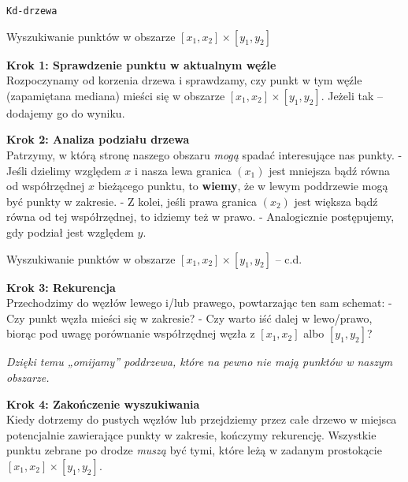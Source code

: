 \documentclass[aspectratio=1610, polish]{beamer}
\begin{document}
\begin{section}{\texttt{Kd-drzewa}}
\begin{frame}{Wyszukiwanie punktów w obszarze \([x_1, x_2] \times [y_1, y_2]\)}

\begin{mdframed}
\textbf{Krok 1: Sprawdzenie punktu w aktualnym węźle}\\[3pt]
Rozpoczynamy od korzenia drzewa i sprawdzamy, czy punkt w tym węźle
(zapamiętana mediana) mieści się w obszarze \([x_1, x_2] \times [y_1, y_2]\).
Jeżeli tak – dodajemy go do wyniku.
\end{mdframed}

\begin{mdframed}
\textbf{Krok 2: Analiza podziału drzewa} \\[3pt]
Patrzymy, w którą stronę naszego obszaru \textit{mogą} spadać interesujące nas punkty.
- Jeśli dzielimy względem \(x\) i nasza lewa granica \((x_1)\) jest mniejsza bądź równa od współrzędnej \(x\) bieżącego punktu,
  to \textbf{wiemy}, że w lewym poddrzewie mogą być punkty w zakresie.  
- Z kolei, jeśli prawa granica \((x_2)\) jest większa bądź równa od tej współrzędnej,
  to idziemy też w prawo.
- Analogicznie postępujemy, gdy podział jest względem \(y\).
\end{mdframed}

\end{frame}
\begin{frame}{Wyszukiwanie punktów w obszarze \([x_1, x_2] \times [y_1, y_2]\) -- c.d.}
\begin{mdframed}
\textbf{Krok 3: Rekurencja} \\[3pt]
Przechodzimy do węzłów lewego i/lub prawego, powtarzając ten sam schemat:
- Czy punkt węzła mieści się w zakresie?
- Czy warto iść dalej w lewo/prawo, biorąc pod uwagę porównanie
  współrzędnej węzła z \([x_1, x_2]\) albo \([y_1, y_2]\)?

\textit{Dzięki temu „omijamy” poddrzewa, które na pewno nie mają punktów w naszym obszarze.}
\end{mdframed}

\begin{mdframed}
\textbf{Krok 4: Zakończenie wyszukiwania}\\[3pt]
Kiedy dotrzemy do pustych węzłów lub przejdziemy przez całe drzewo w miejsca
potencjalnie zawierające punkty w zakresie, kończymy rekurencję.  
Wszystkie punktu zebrane po drodze \emph{muszą} być tymi, które leżą
w zadanym prostokącie \([x_1, x_2] \times [y_1, y_2]\).
\end{mdframed}


\end{frame}
\end{section}
\end{document}
